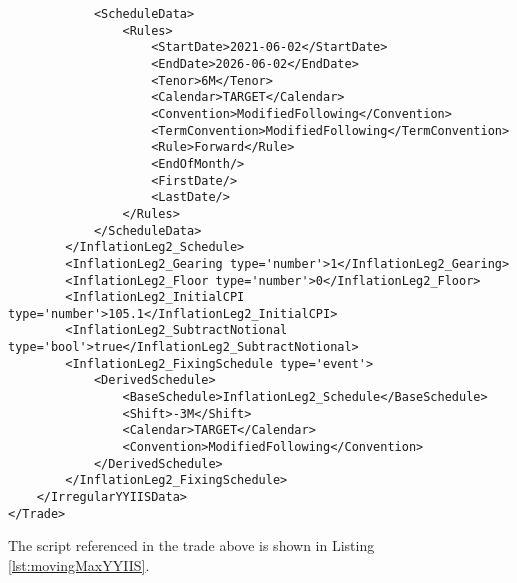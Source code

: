 \begin{verbatim}
			<ScheduleData>
				<Rules>
					<StartDate>2021-06-02</StartDate>
					<EndDate>2026-06-02</EndDate>
					<Tenor>6M</Tenor>
					<Calendar>TARGET</Calendar>
					<Convention>ModifiedFollowing</Convention>
					<TermConvention>ModifiedFollowing</TermConvention>
					<Rule>Forward</Rule>
					<EndOfMonth/>
					<FirstDate/>
					<LastDate/>
				</Rules>
			</ScheduleData>
		</InflationLeg2_Schedule>
		<InflationLeg2_Gearing type='number'>1</InflationLeg2_Gearing>
		<InflationLeg2_Floor type='number'>0</InflationLeg2_Floor>
		<InflationLeg2_InitialCPI type='number'>105.1</InflationLeg2_InitialCPI>
		<InflationLeg2_SubtractNotional type='bool'>true</InflationLeg2_SubtractNotional>
		<InflationLeg2_FixingSchedule type='event'>
			<DerivedSchedule>
				<BaseSchedule>InflationLeg2_Schedule</BaseSchedule>
				<Shift>-3M</Shift>
				<Calendar>TARGET</Calendar>
				<Convention>ModifiedFollowing</Convention>
			</DerivedSchedule>
		</InflationLeg2_FixingSchedule>
	</IrregularYYIISData>
</Trade>
\end{verbatim}

The script referenced in the trade above is shown in Listing \ref{lst:movingMaxYYIIS}.

